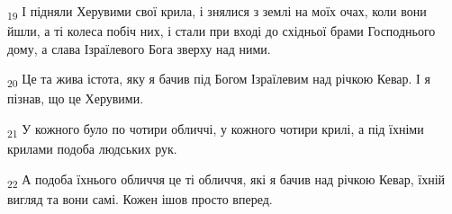 \begin{tcolorbox}
\textsubscript{19} І підняли Херувими свої крила, і знялися з землі на моїх очах, коли вони йшли, а ті колеса побіч них, і стали при вході до східньої брами Господнього дому, а слава Ізраїлевого Бога зверху над ними.
\end{tcolorbox}
\begin{tcolorbox}
\textsubscript{20} Це та жива істота, яку я бачив під Богом Ізраїлевим над річкою Кевар. І я пізнав, що це Херувими.
\end{tcolorbox}
\begin{tcolorbox}
\textsubscript{21} У кожного було по чотири обличчі, у кожного чотири крилі, а під їхніми крилами подоба людських рук.
\end{tcolorbox}
\begin{tcolorbox}
\textsubscript{22} А подоба їхнього обличчя це ті обличчя, які я бачив над річкою Кевар, їхній вигляд та вони самі. Кожен ішов просто вперед.
\end{tcolorbox}
